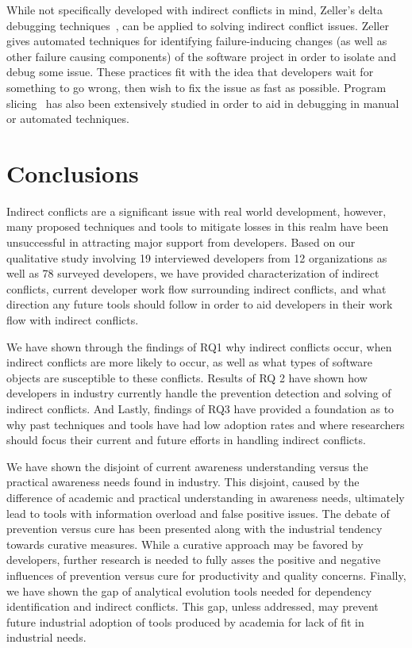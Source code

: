 \documentclass[conference]{IEEEtran}
\begin{document}
While not specifically developed with indirect conflicts in mind, Zeller's delta debugging techniques~\cite{Zeller:2005:WPF}, 
can be applied to solving indirect conflict issues. Zeller gives automated techniques for identifying failure-inducing
changes (as well as other failure causing components) of the software project in order to isolate and debug some issue. These practices fit
with the idea that developers wait for something to go wrong, then wish to fix the issue as fast as possible. Program slicing~\cite{Xu:2005:BSP}
has also been extensively studied in order to aid in debugging in manual or automated techniques.

\section{Conclusions}
\label{sec:conc}

Indirect conflicts are a significant issue with real world development, however, many proposed techniques and tools to mitigate
losses in this realm have been unsuccessful in attracting major support from developers. Based on our qualitative study involving
19 interviewed developers from 12 organizations as well as 78 surveyed developers, we have provided characterization of indirect conflicts,
current developer work flow surrounding indirect conflicts, and what direction any future tools should follow in order to aid developers
in their work flow with indirect conflicts.

We have shown through the findings of RQ1 why indirect conflicts occur, when indirect conflicts are more likely to
occur, as well as what types of software objects are susceptible to these conflicts. Results of RQ 2 have shown
how developers in industry currently handle the prevention detection and solving of indirect conflicts. And Lastly, findings of RQ3
have provided a foundation as to why past techniques and tools have had low adoption rates and where
researchers should focus their current and future efforts in handling indirect conflicts. 

We have shown the disjoint of current awareness understanding versus the practical
awareness needs found in industry. This disjoint, caused by the difference of academic and practical understanding in awareness needs,
ultimately lead to tools with information overload and false positive issues. The debate of prevention versus cure has been presented along with
the industrial tendency towards curative measures. While a curative approach may be favored by developers, further research is needed
to fully asses the positive and negative influences of prevention versus cure for productivity and quality concerns. Finally, we have shown
the gap of analytical evolution tools needed for dependency identification and indirect conflicts. This gap, unless addressed, may prevent
future industrial adoption of tools produced by academia for lack of fit in industrial needs.
\end{document}
